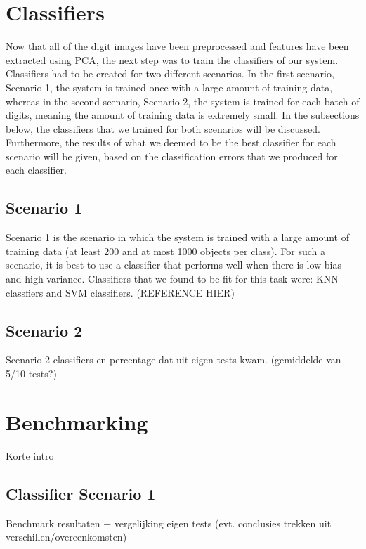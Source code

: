 \documentclass[11pt,twoside,a4paper]{article}
\begin{document}
\section{Classifiers}
Now that all of the digit images have been preprocessed and features have been extracted using PCA, the next step was to train the classifiers of our system. Classifiers had to be created for two different scenarios. In the first scenario, Scenario 1, the system is trained once with a large amount of training data, whereas in the second scenario, Scenario 2, the system is trained for each batch of digits, meaning the amount of training data is extremely small.\newline\newline
In the subsections below, the classifiers that we trained for both scenarios will be discussed. Furthermore, the results of what we deemed to be the best classifier for each scenario will be given, based on the classification errors that we produced for each classifier.
\subsection{Scenario 1}
Scenario 1 is the scenario in which the system is trained with a large amount of training data (at least 200 and at most 1000 objects per class). For such a scenario, it is best to use a classifier that performs well when there is low bias and high variance. Classifiers that we found to be fit for this task were: KNN classfiers and SVM classifiers. (REFERENCE HIER)
%

\subsection{Scenario 2}
Scenario 2 classifiers en percentage dat uit eigen tests kwam. (gemiddelde van 5/10 tests?)



\section{Benchmarking}
Korte intro

\subsection{Classifier Scenario 1}
Benchmark resultaten + vergelijking eigen tests (evt. conclusies trekken uit verschillen/overeenkomsten)
\end{document}
